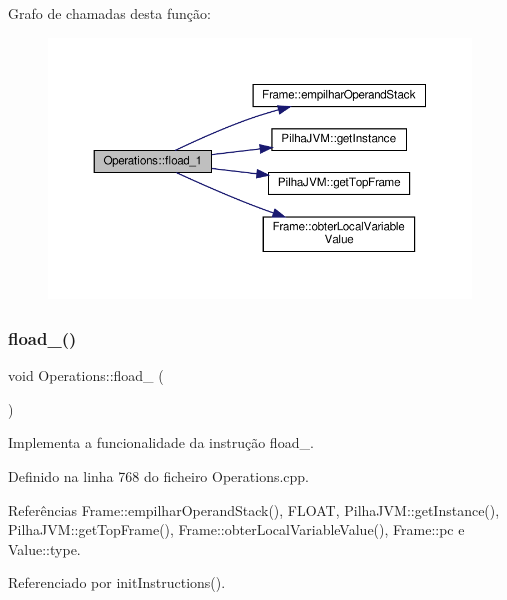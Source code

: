 Grafo de chamadas desta função\+:\nopagebreak
\begin{figure}[H]
\begin{center}
\leavevmode
\includegraphics[width=350pt]{classOperations_a71611bd9fa43e8e170a35f3a5e1f0572_cgraph}
\end{center}
\end{figure}
\mbox{\label{classOperations_a1d1767084d543ab73c8417efe11e195e}} 
\subsubsection{\texorpdfstring{fload\+\_()}{fload\_2()}}
{\footnotesize\ttfamily void Operations\+::fload\+\_ (\begin{DoxyParamCaption}{ }\end{DoxyParamCaption})\hspace{0.3cm}{\ttfamily [private]}}



Implementa a funcionalidade da instrução fload\+\_. 



Definido na linha 768 do ficheiro Operations.\+cpp.



Referências Frame\+::empilhar\+Operand\+Stack(), F\+L\+O\+AT, Pilha\+J\+V\+M\+::get\+Instance(), Pilha\+J\+V\+M\+::get\+Top\+Frame(), Frame\+::obter\+Local\+Variable\+Value(), Frame\+::pc e Value\+::type.



Referenciado por init\+Instructions().

